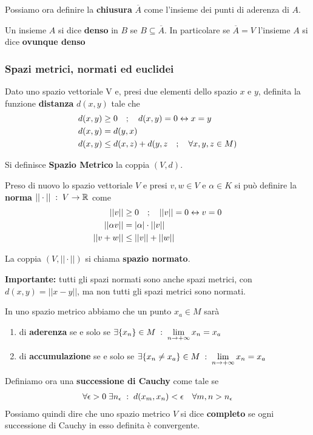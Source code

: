Possiamo ora definire la \textbf{chiusura} $\overline{A}$ come l'insieme dei punti di aderenza di $A$. 

Un insieme $A$ si dice \textbf{denso} in $B$ se $B \subseteq \overline{A}$. In particolare se $\overline{A} = V$ l'insieme $A$ si dice \textbf{ovunque denso}



\newpage
\subsubsection{Spazi metrici, normati ed euclidei}

Dato uno spazio  vettoriale V e, presi due elementi dello spazio $x$ e $y$, definita la funzione \textbf{distanza} $d(x,y)$ tale che
\begin{align}
	d(x,y) &\geq 0 \quad ; \quad d(x,y) = 0 \leftrightarrow x=y\\
	d(x,y) & = d(y,x)\\
	d(x,y) &\leq d(x,z) + d(y,z \quad ; \quad \forall x,y,z \in M) 
\end{align}

Si definisce \textbf{Spazio Metrico} la coppia $(V,d)$.

Preso di nuovo lo spazio vettoriale $V$ e presi $v,w\in V$ e $\alpha \in K$ si può definire la \textbf{norma} $||\cdot|| \; : \; V \rightarrow \mathbb{R}$ come
\begin{align}
	||v|| &\geq 0 \quad ; \quad ||v|| = 0 \leftrightarrow v= 0\\
	||\alpha v || &= |\alpha|\cdot ||v||\\
	||v + w|| &\leq ||v|| + ||w||
\end{align}

La coppia $(V, ||\cdot ||)$ si chiama \textbf{spazio normato}. 


\textbf{Importante:} tutti gli spazi normati sono anche spazi metrici, con $d(x,y) = ||x-y||$, ma non tutti gli spazi metrici sono normati.

In uno spazio metrico abbiamo che un punto $x_a\in M$ sarà
\begin{enumerate}
	\item di \textbf{aderenza} se e solo se $\exists \{x_n\} \in M \; : \; \underset{n \rightarrow +\infty}{\lim} \, x_n = x_a$
	\item di \textbf{accumulazione} se e solo se $\exists \{x_n\neq x_a\} \in M \; : \; \underset{n \rightarrow +\infty}{\lim} \, x_n = x_a$
\end{enumerate}

Definiamo ora una \textbf{successione di Cauchy} come tale se
\begin{align}
	\forall \epsilon > 0 \; \exists n_\epsilon \; : \; d(x_m,x_n) <\epsilon \quad \forall m,n > n_\epsilon
\end{align}
Possiamo quindi dire che uno spazio metrico $V$ si dice \textbf{completo} se ogni successione di Cauchy in esso definita è convergente.


